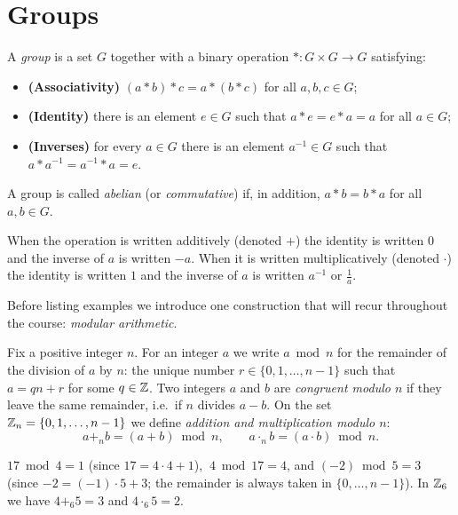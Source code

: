 \section{Groups}

\begin{definition}
A \emph{group} is a set $G$ together with a binary operation $*\colon G\times G\to G$ satisfying:
\begin{itemize}
\item \textbf{(Associativity)} $(a*b)*c = a*(b*c)$ for all $a,b,c\in G$;
\item \textbf{(Identity)} there is an element $e\in G$ such that $a*e=e*a=a$ for all $a\in G$;
\item \textbf{(Inverses)} for every $a\in G$ there is an element $a^{-1}\in G$ such that
$a*a^{-1}=a^{-1}*a=e$.
\end{itemize}
A group is called \emph{abelian} (or \emph{commutative}) if, in addition, $a*b=b*a$ for all $a,b\in G$.
\end{definition}

\begin{remark}
When the operation is written additively (denoted $+$) the identity is written $0$ and the inverse of $a$ is
written $-a$. When it is written multiplicatively (denoted $\cdot$) the identity is written $1$ and the
inverse of $a$ is written $a^{-1}$ or $\tfrac{1}{a}$.
\end{remark}

Before listing examples we introduce one construction that will recur throughout the course:
\emph{modular arithmetic}.

\begin{definition}
Fix a positive integer $n$. For an integer $a$ we write $a \bmod n$ for the remainder of the division of
$a$ by $n$: the unique number $r\in\{0,1,\ldots,n-1\}$ such that $a = qn + r$ for some $q\in\mathbb{Z}$. Two
integers $a$ and $b$ are \emph{congruent modulo $n$} if they leave the same remainder, i.e.\ if $n$
divides $a-b$. On the set $\mathbb{Z}_n = \{0,1,\ldots,n-1\}$ we define \emph{addition and multiplication modulo
$n$}:
\[
a +_n b = (a+b) \bmod n, \qquad a \cdot_n b = (a\cdot b) \bmod n.
\]
\end{definition}

\begin{example}
$17 \bmod 4 = 1$ (since $17 = 4\cdot 4+1$), $\ 4 \bmod 17 = 4$, and $(-2)\bmod 5 = 3$ (since
$-2 = (-1)\cdot 5 + 3$; the remainder is always taken in $\{0,\ldots,n-1\}$). In $\mathbb{Z}_6$ we have
$4 +_6 5 = 3$ and $4 \cdot_6 5 = 2$.
\end{example}

